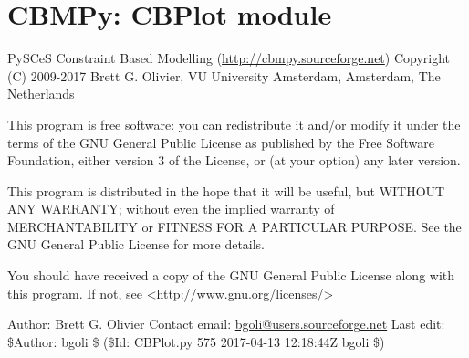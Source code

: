\documentclass[a4paper,11pt,english]{sphinxmanual}
\begin{document}
\label{modules_doc:module-cbmpy.CBPlot}

\section{CBMPy: CBPlot module}
\label{modules_doc:cbmpy-cbplot-module}
PySCeS Constraint Based Modelling (\url{http://cbmpy.sourceforge.net})
Copyright (C) 2009-2017 Brett G. Olivier, VU University Amsterdam, Amsterdam, The Netherlands

This program is free software: you can redistribute it and/or modify
it under the terms of the GNU General Public License as published by
the Free Software Foundation, either version 3 of the License, or
(at your option) any later version.

This program is distributed in the hope that it will be useful,
but WITHOUT ANY WARRANTY; without even the implied warranty of
MERCHANTABILITY or FITNESS FOR A PARTICULAR PURPOSE.  See the
GNU General Public License for more details.

You should have received a copy of the GNU General Public License
along with this program.  If not, see \textless{}\url{http://www.gnu.org/licenses/}\textgreater{}

Author: Brett G. Olivier
Contact email: \href{mailto:bgoli@users.sourceforge.net}{bgoli@users.sourceforge.net}
Last edit: \$Author: bgoli \$ (\$Id: CBPlot.py 575 2017-04-13 12:18:44Z bgoli \$)
\end{document}
